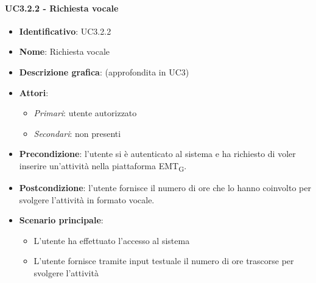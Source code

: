 \paragraph{UC3.2.2 - Richiesta vocale}
\begin{itemize}
   \item \textbf{Identificativo}: UC3.2.2
   \item \textbf{Nome}: Richiesta vocale
   \item \textbf{Descrizione grafica}: (approfondita in UC3)
   \item \textbf{Attori}:
   \begin{itemize} 
       \item \textit{Primari}: utente autorizzato
       \item \textit{Secondari}: non presenti
   \end{itemize}
       \item \textbf{Precondizione}: l'utente si è autenticato al sistema e ha richiesto di voler inserire un'attività nella piattaforma EMT\textsubscript{G}. 
       \item \textbf{Postcondizione}: l'utente fornisce il numero di ore che lo hanno coinvolto per svolgere l'attività in formato vocale.
    \item \textbf{Scenario principale}: 
       \begin{itemize}
           \item L'utente ha effettuato l'accesso al sistema 
           \item L'utente fornisce tramite input testuale il numero di ore trascorse per svolgere l'attività
       \end{itemize}
\end{itemize}

